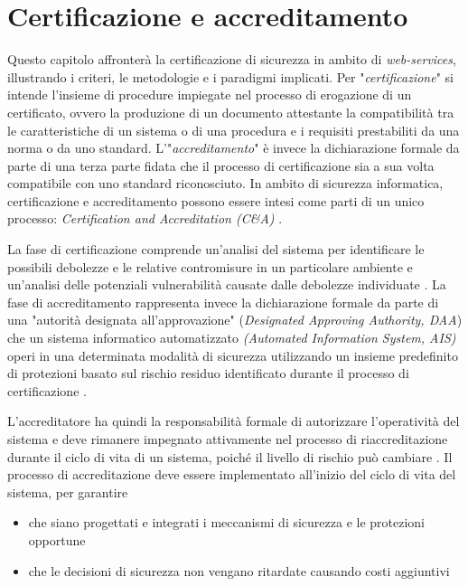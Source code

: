 \documentclass[../main.tex]{subfiles}
\begin{document}
\chapter{Certificazione e accreditamento}
Questo capitolo affronterà la certificazione di sicurezza in ambito di \textit{web-services}, illustrando i criteri, le metodologie e i paradigmi implicati.
Per "\textit{certificazione}" si intende l'insieme di procedure impiegate nel processo di erogazione di un certificato, ovvero la produzione di un documento attestante la compatibilità tra le caratteristiche di un sistema o di una procedura e i requisiti prestabiliti da una norma o da uno standard.
L'"\textit{accreditamento}" è invece la dichiarazione formale da parte di una terza parte fidata che il processo di certificazione sia a sua volta compatibile con uno standard riconosciuto.
In ambito di sicurezza informatica, certificazione e accreditamento possono essere intesi come parti di un unico processo: \textit{Certification and Accreditation (C\&A)} \cite{NistCAHandbook}.

La fase di certificazione comprende un'analisi del sistema per identificare le possibili debolezze e le relative contromisure in un particolare ambiente e un'analisi delle potenziali vulnerabilità causate dalle debolezze individuate \cite{NistCAHandbook}.
La fase di accreditamento rappresenta invece la dichiarazione formale da parte di una "autorità designata all'approvazione" (\textit{Designated Approving Authority, DAA}) che un sistema informatico  automatizzato \textit{(Automated Information System, AIS)} operi in una determinata modalità di sicurezza utilizzando un insieme predefinito di protezioni basato sul rischio residuo identificato durante il processo di certificazione \cite{NistCAHandbook}.

L'accreditatore ha quindi la responsabilità formale di autorizzare l'operatività del sistema e deve rimanere impegnato attivamente nel processo di riaccreditazione durante il ciclo di vita di un sistema, poiché il livello di rischio può cambiare \cite{NistCAHandbook}.
Il processo di accreditazione deve essere implementato all'inizio del ciclo di vita del sistema, per garantire
\begin{itemize}
\item che siano progettati e integrati i meccanismi di sicurezza e le protezioni opportune
\item che le decisioni di sicurezza non vengano ritardate causando costi aggiuntivi
\end{itemize}
\end{document}
